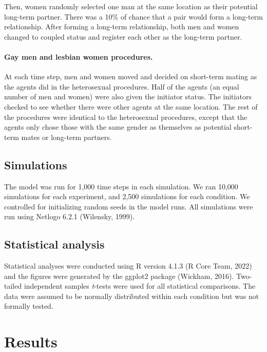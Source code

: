 \documentclass[
  11pt,
]{article}
\begin{document}
Then, women randomly selected one man at the same location as their
potential long-term partner. There was a 10\% of chance that a pair
would form a long-term relationship. After forming a long-term
relationship, both men and women changed to coupled status and register
each other as the long-term partner.

\hypertarget{gay-men-and-lesbian-women-procedures.}{%
\paragraph{Gay men and lesbian women
procedures.}\label{gay-men-and-lesbian-women-procedures.}}

At each time step, men and women moved and decided on short-term mating
as the agents did in the heterosexual procedures. Half of the agents (an
equal number of men and women) were also given the initiator status. The
initiators checked to see whether there were other agents at the same
location. The rest of the procedures were identical to the heterosexual
procedures, except that the agents only chose those with the same gender
as themselves as potential short-term mates or long-term partners.

\hypertarget{simulations}{%
\subsection{Simulations}\label{simulations}}

The model was run for 1,000 time steps in each simulation. We ran 10,000
simulations for each experiment, and 2,500 simulations for each
condition. We controlled for initializing random seeds in the model
runs. All simulations were run using Netlogo 6.2.1 (Wilensky, 1999).

\hypertarget{statistical-analysis}{%
\subsection{Statistical analysis}\label{statistical-analysis}}

Statistical analyses were conducted using R version 4.1.3 (R Core Team,
2022) and the figures were generated by the ggplot2 package (Wickham,
2016). Two-tailed independent samples \emph{t}-tests were used for all
statistical comparisons. The data were assumed to be normally
distributed within each condition but was not formally tested.

\hypertarget{results}{%
\section{Results}\label{results}}
\end{document}
